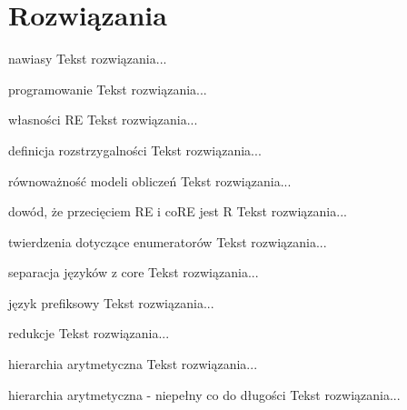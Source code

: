 \section*{Rozwiązania}


\begin{solution}{nawiasy}
Tekst rozwiązania...
\end{solution}

\begin{solution}{programowanie}
Tekst rozwiązania...
\end{solution}

\begin{solution}{własności RE}
Tekst rozwiązania...
\end{solution}

\begin{solution}{definicja rozstrzygalności}
Tekst rozwiązania...
\end{solution}

\begin{solution}{równoważność modeli obliczeń}
Tekst rozwiązania...
\end{solution}

\begin{solution}{dowód, że przecięciem RE i coRE jest R}
Tekst rozwiązania...
\end{solution}

\begin{solution}{twierdzenia dotyczące enumeratorów}
Tekst rozwiązania...
\end{solution}

\begin{solution}{separacja języków z core}
Tekst rozwiązania...
\end{solution}

\begin{solution}{język prefiksowy}
Tekst rozwiązania...
\end{solution}

\begin{solution}{redukcje}
Tekst rozwiązania...
\end{solution}

\begin{solution}{hierarchia arytmetyczna}
Tekst rozwiązania...
\end{solution}

\begin{solution}{hierarchia arytmetyczna - niepełny co do długości}
Tekst rozwiązania...
\end{solution}

